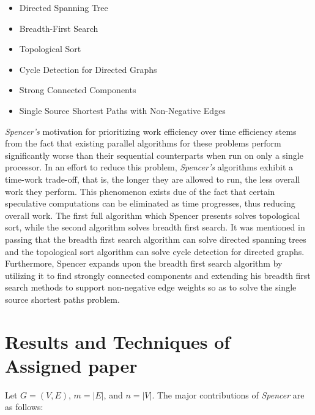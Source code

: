 \documentclass[paper=a4, fontsize=11pt]{scrartcl} %
\numberwithin{equation}{section} %
\numberwithin{figure}{section} %
\numberwithin{table}{section} %
\begin{document}
\begin{itemize}
\item Directed Spanning Tree
\item Breadth-First Search
\item Topological Sort
\item Cycle Detection for Directed Graphs
\item Strong Connected Components
\item Single Source Shortest Paths with Non-Negative Edges
\end{itemize}

\textit{Spencer's\cite{S97}} motivation for prioritizing work efficiency over time efficiency stems from the fact that existing parallel algorithms for these problems perform significantly worse than their sequential counterparts when run on only a single processor. In an effort to reduce this problem, \textit{Spencer's\cite{S97}} algorithms exhibit a time-work trade-off, that is, the longer they are allowed to run, the less overall work they perform. This phenomenon exists due of the fact that certain speculative computations can be eliminated as time progresses, thus reducing overall work. The first full algorithm which Spencer presents solves topological sort, while the second algorithm solves breadth first search. It was mentioned in passing that the breadth first search algorithm can solve directed spanning trees and the topological sort algorithm can solve cycle detection for directed graphs. Furthermore, Spencer expands upon the breadth first search algorithm  by utilizing it to find strongly connected components and extending his breadth first search methods to support non-negative edge weights so as to solve the single source shortest paths problem.\\ 


\section{Results and Techniques of Assigned paper}

Let $G = (V,E)$, $m = |E|$, and $n = |V|$. The major contributions of \textit{Spencer\cite{S97}} are as follows:
\end{document}
